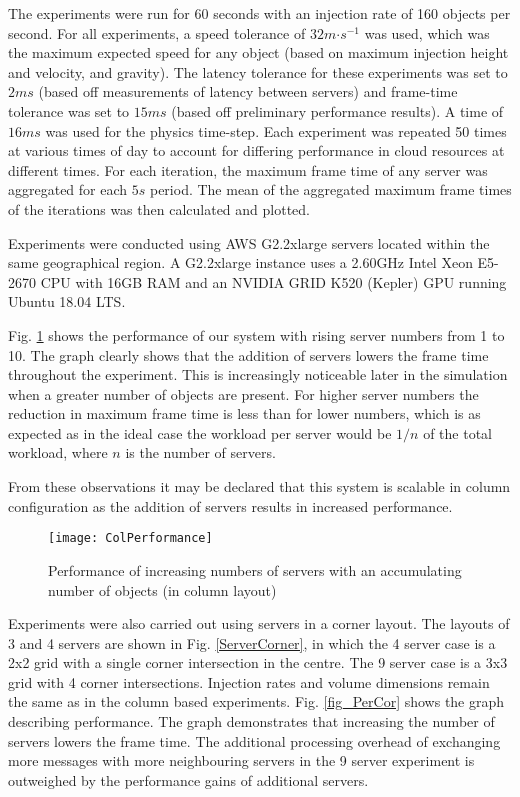 The experiments were run for 60 seconds with an injection rate of 160 objects per second. For all experiments, a speed tolerance of $32m\mathord{\cdot}s^{-1}$ was used, which was the maximum expected speed for any object (based on maximum injection height and velocity, and gravity). The latency tolerance for these experiments was set to $2ms$ (based off measurements of latency between servers) and frame-time tolerance was set to $15ms$ (based off preliminary performance results). A time of $16ms$ was used for the physics time-step. Each experiment was repeated 50 times at various times of day to account for differing performance in cloud resources at different times. For each iteration, the maximum frame time of any server was aggregated for each $5s$ period. The mean of the aggregated maximum frame times of the iterations was then calculated and plotted.

Experiments were conducted using AWS G2.2xlarge servers located within the same geographical region. A G2.2xlarge instance uses a 2.60GHz Intel Xeon E5-2670 CPU with 16GB RAM and an NVIDIA GRID K520 (Kepler) GPU running Ubuntu 18.04 LTS.

Fig. \ref{fig_PerCol} shows the performance of our system with rising server numbers from 1 to 10. The graph clearly shows that the addition of servers lowers the frame time throughout the experiment. This is increasingly noticeable later in the simulation when a greater number of objects are present. For higher server numbers the reduction in maximum frame time is less than for lower numbers, which is as expected as in the ideal case the workload per server would be $1/n$ of the total workload, where $n$ is the number of servers. 

From these observations it may be declared that this system is scalable in column configuration as the addition of servers results in increased performance.

\begin{figure}[!t]
	\centering
	\texttt{[image: ColPerformance]}
	\caption{Performance of increasing numbers of servers with an accumulating number of objects (in column layout)}
	\label{fig_PerCol}
\end{figure}

Experiments were also carried out using servers in a corner layout. The layouts of 3 and 4 servers are shown in Fig. \ref{ServerCorner}, in which the 4 server case is a 2x2 grid with a single corner intersection in the centre. The 9 server case is a 3x3 grid with 4 corner intersections. Injection rates and volume dimensions remain the same as in the column based experiments. Fig. \ref{fig_PerCor} shows the graph describing performance. The graph demonstrates that increasing the number of servers lowers the frame time. The additional processing overhead of exchanging more messages with more neighbouring servers in the 9 server experiment is outweighed by the performance gains of additional servers.

